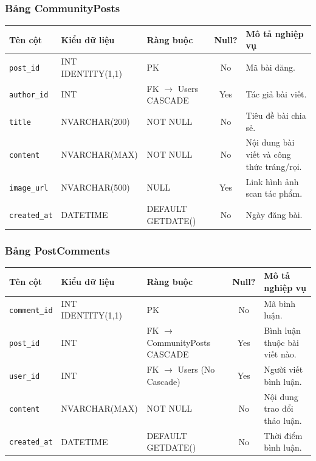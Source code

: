 \subsubsection{Bảng CommunityPosts}
\begin{table}[H]
\centering
\small
\begin{tabularx}{\textwidth}{l l l c X}
\toprule
\textbf{Tên cột} & \textbf{Kiểu dữ liệu} & \textbf{Ràng buộc} & \textbf{Null?} & \textbf{Mô tả nghiệp vụ} \\
\midrule
\texttt{post\_id} & INT IDENTITY(1,1) & PK & No & Mã bài đăng. \\
\texttt{author\_id} & INT & FK $\rightarrow$ Users CASCADE & Yes & Tác giả bài viết. \\
\texttt{title} & NVARCHAR(200) & NOT NULL & No & Tiêu đề bài chia sẻ. \\
\texttt{content} & NVARCHAR(MAX) & NOT NULL & No & Nội dung bài viết và công thức tráng/rọi. \\
\texttt{image\_url} & NVARCHAR(500) & NULL & Yes & Link hình ảnh scan tác phẩm. \\
\texttt{created\_at} & DATETIME & DEFAULT GETDATE() & No & Ngày đăng bài. \\
\bottomrule
\end{tabularx}
\end{table}

\subsubsection{Bảng PostComments}
\begin{table}[H]
\centering
\small
\begin{tabularx}{\textwidth}{l l l c X}
\toprule
\textbf{Tên cột} & \textbf{Kiểu dữ liệu} & \textbf{Ràng buộc} & \textbf{Null?} & \textbf{Mô tả nghiệp vụ} \\
\midrule
\texttt{comment\_id} & INT IDENTITY(1,1) & PK & No & Mã bình luận. \\
\texttt{post\_id} & INT & FK $\rightarrow$ CommunityPosts CASCADE & Yes & Bình luận thuộc bài viết nào. \\
\texttt{user\_id} & INT & FK $\rightarrow$ Users (No Cascade) & Yes & Người viết bình luận. \\
\texttt{content} & NVARCHAR(MAX) & NOT NULL & No & Nội dung trao đổi thảo luận. \\
\texttt{created\_at} & DATETIME & DEFAULT GETDATE() & No & Thời điểm bình luận. \\
\bottomrule
\end{tabularx}
\end{table}

